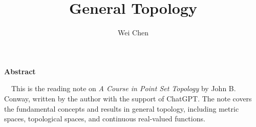 \documentclass[11pt]{article}
\title{General Topology}
\author{Wei Chen}
\theoremstyle{definition}
\begin{document}
    \maketitle
	\allowdisplaybreaks
	\setcounter{page}{1}
	\begin{center}
		\textbf{\Large Abstract} 
        
              
    \end{center}~\
    This is the reading note on \textit{A Course in Point Set Topology} by John B. Conway, written by the author with the support of ChatGPT. The note covers the fundamental concepts and results in general topology, including metric spaces, topological spaces, and continuous real-valued functions.  
	




\end{document}
